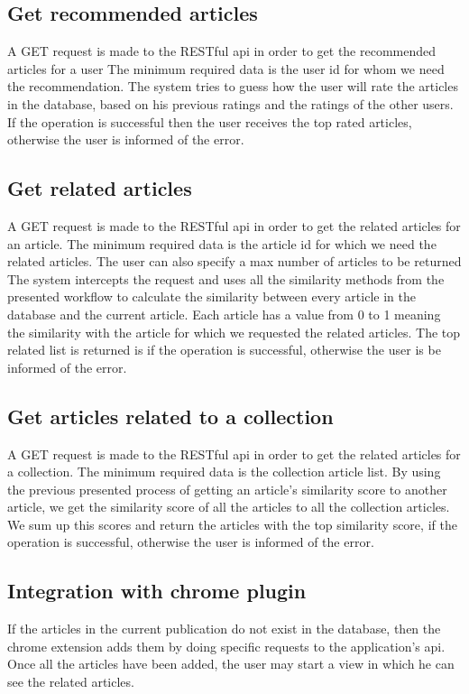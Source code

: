 \subsection{Get recommended articles}
\label{sec:workflow-get-recommended-articles}
A GET request is made to the RESTful api in order to get the recommended articles for a user
The minimum required data is the user id for whom we need the recommendation.
The system tries to guess how the user will rate the articles in the database, based on his previous ratings and the ratings of the other users.
If the operation is successful then the user receives the top rated articles, otherwise the user is informed of the error.

\subsection{Get related articles}
\label{sec:workflow-get-related-articles}
A GET request is made to the RESTful api in order to get the related articles for an article.
The minimum required data is the article id for which we need the related articles. The user can also specify a max number of articles to be returned
The system intercepts the request and uses all the similarity methods from the presented workflow to calculate the similarity between every article in the database and the current article.
Each article has a value from 0 to 1 meaning the similarity with the article for which we requested the related articles.
The top related list is returned is if the operation is successful, otherwise the user is be informed of the error.


\subsection{Get articles related to a collection}
\label{sec:workflow-get-articles-related-to-collection}
A GET request is made to the RESTful api in order to get the related articles for  a collection.
The minimum required data is the collection article list.
By using the previous presented process of getting an article’s similarity score to another article, we get the similarity score of all the articles to all the collection articles. We sum up this scores and return the articles with the top similarity score, if the operation is successful, otherwise the user is informed of the error.

\subsection{Integration with chrome plugin}
\label{sec:workflow-integration-with-chrome-plugin}
If the articles in the current publication do not exist in the database, then the chrome extension adds them by doing specific requests to the application's api.
Once all the articles have been added, the user may start a view in which he can see the related articles.